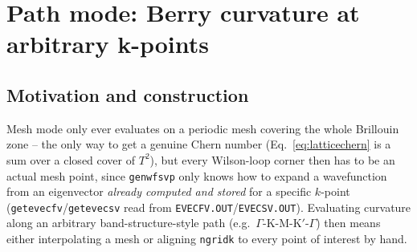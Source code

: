 \documentclass[11pt]{article}
\begin{document}
\section{Path mode: Berry curvature at arbitrary k-points}

\subsection{Motivation and construction}

Mesh mode only ever evaluates on a periodic mesh covering the whole Brillouin zone --
the only way to get a genuine Chern number (Eq.~\eqref{eq:latticechern} is a sum over a
closed cover of $T^2$), but every Wilson-loop corner then has to be an actual mesh
point, since \texttt{genwfsvp} only knows how to expand a wavefunction from an
eigenvector \emph{already computed and stored} for a specific $k$-point
(\texttt{getevecfv}/\texttt{getevecsv} read from \texttt{EVECFV.OUT}/\texttt{EVECSV.OUT}).
Evaluating curvature along an arbitrary band-structure-style path (e.g.\
$\Gamma$-K-M-K$'$-$\Gamma$) then means either interpolating a mesh or aligning
\texttt{ngridk} to every point of interest by hand.
\end{document}
